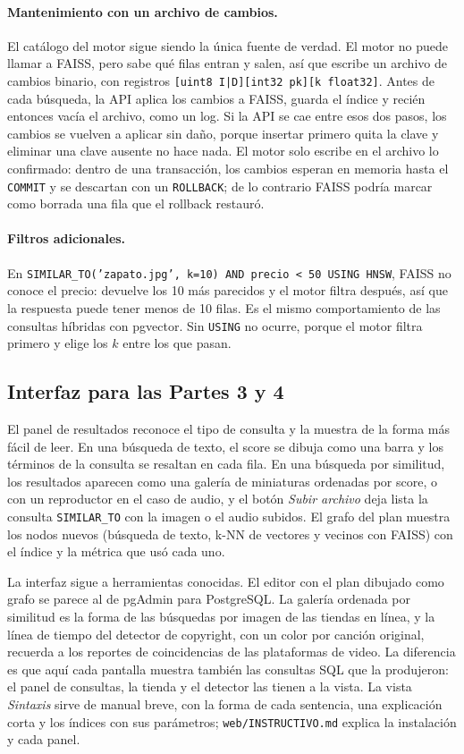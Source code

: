 \documentclass[11pt,a4paper]{article}
\begin{document}
\paragraph{Mantenimiento con un archivo de cambios.} El catálogo del motor sigue siendo la única fuente de verdad. El motor no puede llamar a FAISS, pero sabe qué filas entran y salen, así que escribe un archivo de cambios binario, con registros \texttt{[uint8 I|D][int32 pk][k float32]}. Antes de cada búsqueda, la API aplica los cambios a FAISS, guarda el índice y recién entonces vacía el archivo, como un log. Si la API se cae entre esos dos pasos, los cambios se vuelven a aplicar sin daño, porque insertar primero quita la clave y eliminar una clave ausente no hace nada. El motor solo escribe en el archivo lo confirmado: dentro de una transacción, los cambios esperan en memoria hasta el \texttt{COMMIT} y se descartan con un \texttt{ROLLBACK}; de lo contrario FAISS podría marcar como borrada una fila que el rollback restauró.

\paragraph{Filtros adicionales.} En \texttt{SIMILAR\_TO('zapato.jpg', k=10) AND precio < 50 USING HNSW}, FAISS no conoce el precio: devuelve los 10 más parecidos y el motor filtra después, así que la respuesta puede tener menos de 10 filas. Es el mismo comportamiento de las consultas híbridas con pgvector. Sin \texttt{USING} no ocurre, porque el motor filtra primero y elige los $k$ entre los que pasan.

\subsection{Interfaz para las Partes 3 y 4}

El panel de resultados reconoce el tipo de consulta y la muestra de la forma más fácil de leer. En una búsqueda de texto, el score se dibuja como una barra y los términos de la consulta se resaltan en cada fila. En una búsqueda por similitud, los resultados aparecen como una galería de miniaturas ordenadas por score, o con un reproductor en el caso de audio, y el botón \emph{Subir archivo} deja lista la consulta \texttt{SIMILAR\_TO} con la imagen o el audio subidos. El grafo del plan muestra los nodos nuevos (búsqueda de texto, k-NN de vectores y vecinos con FAISS) con el índice y la métrica que usó cada uno.

La interfaz sigue a herramientas conocidas. El editor con el plan dibujado como grafo se parece al de pgAdmin para PostgreSQL. La galería ordenada por similitud es la forma de las búsquedas por imagen de las tiendas en línea, y la línea de tiempo del detector de copyright, con un color por canción original, recuerda a los reportes de coincidencias de las plataformas de video. La diferencia es que aquí cada pantalla muestra también las consultas SQL que la produjeron: el panel de consultas, la tienda y el detector las tienen a la vista. La vista \emph{Sintaxis} sirve de manual breve, con la forma de cada sentencia, una explicación corta y los índices con sus parámetros; \texttt{web/INSTRUCTIVO.md} explica la instalación y cada panel.
\end{document}
